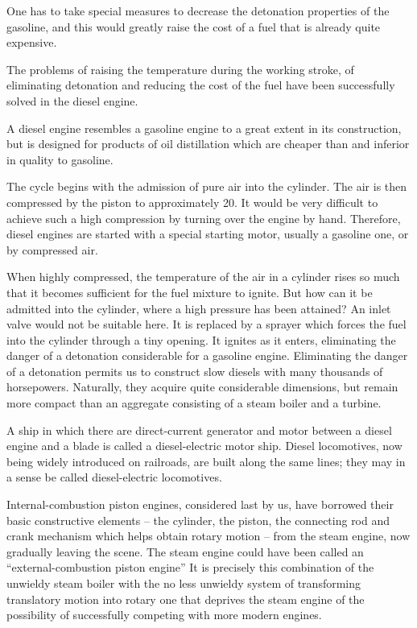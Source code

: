 One has to take special measures to decrease the deto­nation properties of the gasoline, and this would greatly raise the cost of a fuel that is already quite expen­sive.

The problems of raising the temperature during the working stroke, of eliminating detonation and reducing the cost of the fuel have been successfully solved in the diesel engine.

A diesel engine resembles a gasoline engine to a great extent in its construction, but is designed for products of oil distillation which are cheaper than and inferior in quality to gasoline.

The cycle begins with the admission of pure air into the cylinder. The air is then compressed by the piston to approximately \SI{20}{\atmos}. It would be very difficult to achieve such a high compression by turning over the engine by hand. Therefore, diesel engines are started with a special starting motor, usually a gasoline one, or by compressed air.

When highly compressed, the temperature of the air in a cylinder rises so much that it becomes sufficient for the fuel mixture to ignite. But how can it be admitted into the cylinder, where a high pressure has been attained? An inlet valve would not be suitable here. It is replaced by a sprayer which forces the fuel into the cylinder through a tiny opening. It ignites as it enters, eliminating the danger of a detonation considerable for a gasoline engine.
Eliminating the danger of a detonation permits us to construct slow diesels with many thousands of horsepow­ers. Naturally, they acquire quite considerable dimen­sions, but remain more compact than an aggregate consisting of a steam boiler and a turbine.

A ship in which there are direct-current generator and motor between a diesel engine and a blade is called a diesel-electric motor ship.
Diesel locomotives, now being widely introduced on railroads, are built along the same lines; they may in a sense be called diesel-electric locomotives.

Internal-combustion piston engines, considered last by us, have borrowed their basic constructive elements -- the cylinder, the piston, the connecting rod and crank mechanism which helps obtain rotary motion -- from the steam engine, now gradually leaving the scene. The steam engine could have been called an ``external-combustion piston engine'' It is precisely this combination of the unwieldy steam boiler with the no less unwieldy system of transforming translatory motion into rotary one that deprives the steam engine of the possibility of successfully competing with more modern engines.

